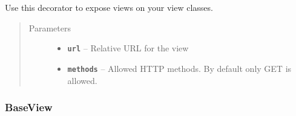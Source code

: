 \documentclass[letterpaper,10pt,english]{sphinxmanual}
\begin{document}
\begin{fulllineitems}
\label{api:flask.ext.appbuilder.baseviews.expose}
Use this decorator to expose views on your view classes.
\begin{quote}\begin{description}
\item[{Parameters}] \leavevmode\begin{itemize}
\item {} 
\textbf{\texttt{url}} -- Relative URL for the view

\item {} 
\textbf{\texttt{methods}} -- Allowed HTTP methods. By default only GET is allowed.

\end{itemize}

\end{description}\end{quote}

\end{fulllineitems}



\subsubsection{BaseView}
\label{api:baseview}
\end{document}
